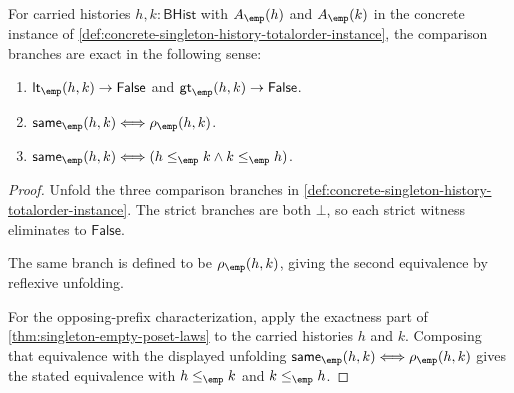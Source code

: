 \begin{theorem}
\label{thm:singleton-totalorder-comparison-exactness}
For carried histories $h,k:\mathsf{BHist}$ with $A_{\emp}(h)$ and
$A_{\emp}(k)$ in the concrete instance of
\autoref{def:concrete-singleton-history-totalorder-instance}, the comparison
branches are exact in the following sense:
\begin{enumerate}
  \item $\mathsf{lt}_{\emp}(h,k)\to\mathsf{False}$ and
  $\mathsf{gt}_{\emp}(h,k)\to\mathsf{False}$.
  \item $\mathsf{same}_{\emp}(h,k)\Longleftrightarrow\rho_{\emp}(h,k)$.
  \item $\mathsf{same}_{\emp}(h,k)\Longleftrightarrow
  (h\le_{\emp}k\land k\le_{\emp}h)$.
\end{enumerate}
\end{theorem}
\begin{proof}
Unfold the three comparison branches in
\autoref{def:concrete-singleton-history-totalorder-instance}. The strict
branches are both $\bot$, so each strict witness eliminates to
$\mathsf{False}$.

The same branch is defined to be $\rho_{\emp}(h,k)$, giving the second
equivalence by reflexive unfolding.

For the opposing-prefix characterization, apply the exactness part of
\autoref{thm:singleton-empty-poset-laws} to the carried histories $h$ and $k$.
Composing that equivalence with the displayed unfolding
$\mathsf{same}_{\emp}(h,k)\Longleftrightarrow\rho_{\emp}(h,k)$ gives the stated
equivalence with $h\le_{\emp}k$ and $k\le_{\emp}h$.
\end{proof}

